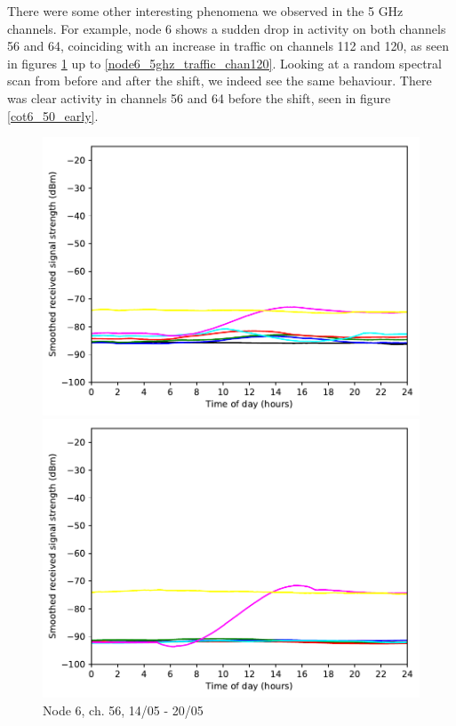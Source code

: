\documentclass[a4paper, 11pt]{article}
\begin{document}
There were some other interesting phenomena we observed in the 5 GHz channels. For example, node 6 shows a sudden drop in activity on both channels 56 and 64, coinciding with an increase in traffic on channels 112 and 120, as seen in figures \ref{node6_5ghz_traffic_chan56} up to \ref{node6_5ghz_traffic_chan120}. Looking at a random spectral scan from before and after the shift, we indeed see the same behaviour. There was clear activity in channels 56 and 64 before the shift, seen in figure \ref{cot6_50_early}.
\begin{figure}[ht]
\begin{minipage}{0.47\textwidth}
	\centering
	\includegraphics[width=\textwidth]{images/5_GHz/cot-node6-student_2017-05-20_chan56_image.pdf}
	\caption{Node 6, ch. 56, 14/05 - 20/05}
	\label{node6_5ghz_traffic_chan56}
\end{minipage}\hfill
\begin{minipage}{0.47\textwidth}
	\centering
	\includegraphics[width=\textwidth]{images/5_GHz/cot-node6-student_2017-05-20_chan64_image.pdf}

\end{minipage}
\end{figure}
\end{document}
